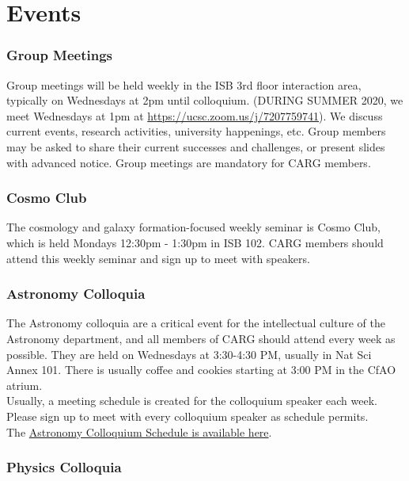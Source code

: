 \section{Events}
\label{sec:events}

\subsubsection{Group Meetings}
\label{sec:group_meetings}
Group meetings will be held
weekly
in the ISB 3rd floor interaction
area, typically on Wednesdays
at 2pm until colloquium. (DURING SUMMER 2020, we meet Wednesdays at 1pm at \href{https://ucsc.zoom.us/j/7207759741}{https://ucsc.zoom.us/j/7207759741}).
We discuss current events,
research activities, university
happenings, etc. Group members
may be asked to share their
current successes and challenges,
or present slides with advanced
notice.
Group meetings are mandatory
for CARG members.

\subsubsection{Cosmo Club}
\label{sec:cosmo_club}

The cosmology and galaxy
formation-focused weekly
seminar is Cosmo Club, 
which is held
Mondays 12:30pm - 1:30pm in
ISB 102. CARG members should
attend this weekly seminar
and sign up 
to meet with speakers.

\subsubsection{Astronomy Colloquia}
\label{sec:astro_colloquia}

The Astronomy colloquia are a
critical event for the
intellectual culture of the
Astronomy department, and all
members of CARG should attend
every week as possible.
They are held on Wednesdays
at 3:30-4:30 PM, usually in
Nat Sci Annex 101.
There is usually
coffee and cookies starting
at 3:00 PM in the CfAO atrium.\\

\noindent
Usually, a meeting schedule is 
created for the colloquium speaker each
week. Please sign up to meet
with every colloquium speaker as
schedule permits.\\

\noindent
The
\href{https://www.astro.ucsc.edu/news-events/Seminars/index.html}{Astronomy Colloquium Schedule is available here}.

\subsubsection{Physics Colloquia}
\label{sec:phys_colloquia}

